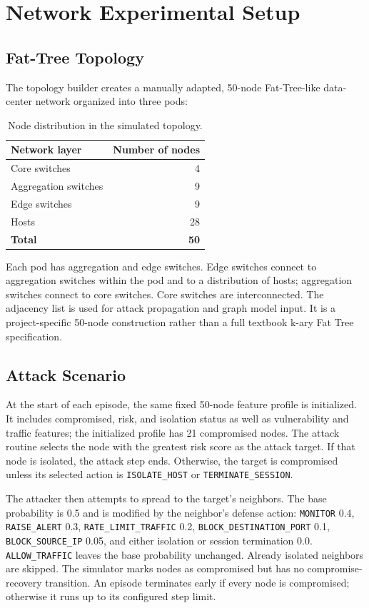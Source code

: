 \documentclass[12pt,a4paper]{report}
\newcommand{\code}[1]{\texttt{#1}}
\begin{document}
\section{Network Experimental Setup}

\subsection{Fat-Tree Topology}

The topology builder creates a manually adapted, 50-node Fat-Tree-like data-center network organized into three pods:

\begin{table}[htbp]
\centering
\caption{Node distribution in the simulated topology.}
\begin{tabular}{lr}
\toprule
\textbf{Network layer} & \textbf{Number of nodes} \\
\midrule
Core switches & 4 \\
Aggregation switches & 9 \\
Edge switches & 9 \\
Hosts & 28 \\
\textbf{Total} & \textbf{50} \\
\bottomrule
\end{tabular}
\end{table}

Each pod has aggregation and edge switches. Edge switches connect to aggregation switches within the pod and to a distribution of hosts; aggregation switches connect to core switches. Core switches are interconnected. The adjacency list is used for attack propagation and graph model input. It is a project-specific 50-node construction rather than a full textbook k-ary Fat Tree specification.

\subsection{Attack Scenario}

At the start of each episode, the same fixed 50-node feature profile is initialized. It includes compromised, risk, and isolation status as well as vulnerability and traffic features; the initialized profile has 21 compromised nodes. The attack routine selects the node with the greatest risk score as the attack target. If that node is isolated, the attack step ends. Otherwise, the target is compromised unless its selected action is \code{ISOLATE\_HOST} or \code{TERMINATE\_SESSION}.

The attacker then attempts to spread to the target's neighbors. The base probability is 0.5 and is modified by the neighbor's defense action: \code{MONITOR} 0.4, \code{RAISE\_ALERT} 0.3, \code{RATE\_LIMIT\_TRAFFIC} 0.2, \code{BLOCK\_DESTINATION\_PORT} 0.1, \code{BLOCK\_SOURCE\_IP} 0.05, and either isolation or session termination 0.0. \code{ALLOW\_TRAFFIC} leaves the base probability unchanged. Already isolated neighbors are skipped. The simulator marks nodes as compromised but has no compromise-recovery transition. An episode terminates early if every node is compromised; otherwise it runs up to its configured step limit.
\end{document}
